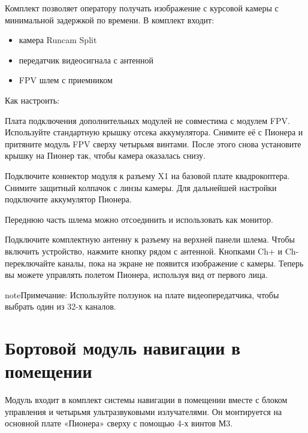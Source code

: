 \documentclass[a4paper,10pt,russian]{sphinxmanual}
\begin{document}
Комплект позволяет оператору получать изображение с курсовой камеры с минимальной задержкой по времени.
В комплект входит:
\begin{itemize}
\item {} 
камера Runcam Split

\item {} 
передатчик видеосигнала с антенной

\item {} 
FPV шлем с приемником

\end{itemize}

Как настроить:

Плата подключения дополнительных модулей не совместима с модулем FPV. Используйте стандартную крышку отсека аккумулятора. Снимите её с Пионера и притяните модуль FPV сверху четырьмя винтами. После этого снова установите крышку на Пионер так, чтобы камера оказалась снизу.

Подключите коннектор модуля к разъему X1 на базовой плате квадрокоптера. Снимите защитный колпачок с линзы камеры. Для дальнейшей настройки подключите аккумулятор Пионера.

Переднюю часть шлема можно отсоединить и использовать как монитор.

Подключите комплектную антенну к разъему на верхней панели шлема. Чтобы включить устройство, нажмите кнопку рядом с антенной. Кнопками Ch+ и Ch- переключайте каналы, пока на экране не появится изображение с камеры. Теперь вы можете управлять полетом Пионера, используя вид от первого лица.

\begin{sphinxadmonition}{note}{Примечание:}
Используйте ползунок на плате видеопередатчика, чтобы выбрать один из 32-х каналов.
\end{sphinxadmonition}


\section{Бортовой модуль навигации в помещении}
\label{\detokenize{module/indoor_nav:id1}}\label{\detokenize{module/indoor_nav::doc}}

Модуль входит в комплект системы навигации в помещении вместе с блоком управления и четырьмя ультразвуковыми излучателями.
Он монтируется на основной плате «Пионера» сверху с помощью 4-х винтов М3.
\end{document}
